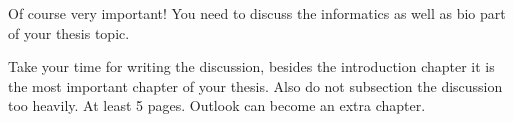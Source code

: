 Of course very important! You need to discuss the informatics as well as bio part of your thesis topic.

\bigskip
Take your time for writing the discussion, besides the introduction chapter it is the most important chapter of your thesis.
Also do not subsection the discussion too heavily.
At least 5 pages.
Outlook can become an extra chapter.
